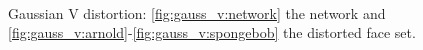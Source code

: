 \begin{figure}
{    }
     \\
    \caption{Gaussian V distortion: \ref{fig:gauss_v:network} the network and \ref{fig:gauss_v:arnold}-\ref{fig:gauss_v:spongebob} the distorted face set.\label{fig:gauss_v}}
\end{figure}

